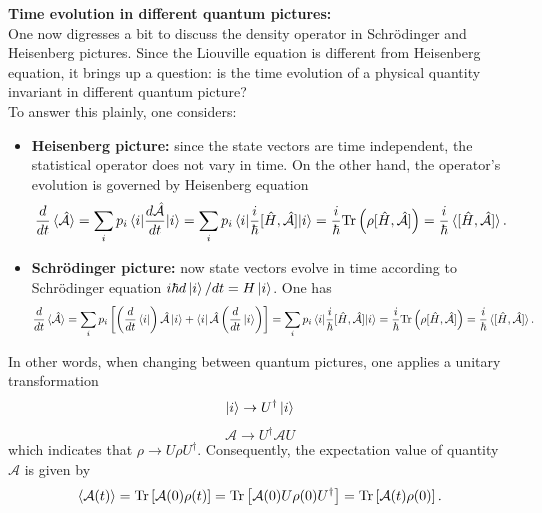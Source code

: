 \documentclass[a4paper,12pts,dvipsnames]{article}
\numberwithin{equation}{section}
\begin{document}
\begin{mdframed}[backgroundcolor=gray!18]
	\textbf{Time evolution in different quantum pictures:}\\
	One now digresses a bit to discuss the density operator in Schr\"{o}dinger and Heisenberg pictures. Since the Liouville equation is different from Heisenberg equation, it brings up a question: is the time evolution of a physical quantity invariant in different quantum picture?\\
	To answer this plainly, one considers:
	\begin{itemize}
		\item \textbf{Heisenberg picture:} since the state vectors are time independent, the statistical operator does not vary in time. On the other hand, the operator's evolution is governed by Heisenberg equation
		\begin{equation*}
			\frac{d}{dt}\braket{\hat{\mathcal{A}}} = \sum_ip_i\braket{i|\frac{d\hat{\mathcal{A}}}{dt}|i} = \sum_ip_i\braket{i|\frac{i}{\hbar}[\hat{H},\hat{\mathcal{A}}]|i} = \frac{i}{\hbar}\text{Tr}\left(\rho[\hat{H},\hat{\mathcal{A}}]\right) = \frac{i}{\hbar}\braket{[\hat{H},\hat{\mathcal{A}}]}.
		\end{equation*}
		\item \textbf{Schr\"{o}dinger picture:} now state vectors evolve in time according to Schr\"{o}dinger equation $i\hbar d\ket{i}/dt = H\ket{i}$. One has
		\begin{equation*}
		\frac{d}{dt}\braket{\hat{\mathcal{A}}} = \sum_ip_i\left[\left(\frac{d}{dt}\bra{i}\right)\hat{\mathcal{A}}\ket{i} + \bra{i}\hat{\mathcal{A}}\left(\frac{d}{dt}\ket{i}\right)\right] = \sum_ip_i\braket{i|\frac{i}{\hbar}[\hat{H},\hat{\mathcal{A}}]|i} = \frac{i}{\hbar}\text{Tr}\left(\rho[\hat{H},\hat{\mathcal{A}}]\right) = \frac{i}{\hbar}\braket{[\hat{H},\hat{\mathcal{A}}]}.
		\end{equation*}
	\end{itemize}
	In other words, when changing between quantum pictures, one applies a unitary transformation $$\ket{i}\rightarrow U^{\dagger}\ket{i}$$ $$\mathcal{A}\rightarrow U^{\dagger}\mathcal{A}U$$
	which indicates that $\rho\rightarrow U\rho U^{\dagger}$. Consequently, the expectation value of quantity $\mathcal{A}$ is given by
	\begin{equation*}
		\braket{\mathcal{A}(t)} = \text{Tr}\left[\mathcal{A}(0)\rho(t)\right] = \text{Tr}\left[\mathcal{A}(0)U\rho(0)U^{\dagger}\right] = \text{Tr}\left[\mathcal{A}(t)\rho(0)\right].
	\end{equation*}
\end{mdframed}
\end{document}
